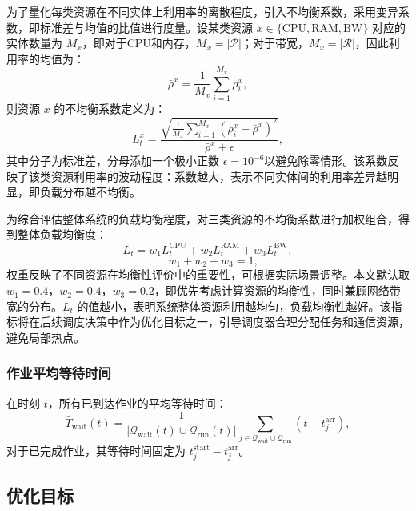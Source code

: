 为了量化每类资源在不同实体上利用率的离散程度，引入不均衡系数，采用变异系数，即标准差与均值的比值进行度量。设某类资源 $x \in \{\text{CPU}, \text{RAM}, \text{BW}\}$ 对应的实体数量为 $M_x$，即对于CPU和内存，$M_x = |\mathcal{P}|$；对于带宽，$M_x = |\mathcal{R}|$，因此利用率的均值为：
\begin{equation}
\bar{\rho}^x = \frac{1}{M_x} \sum_{i=1}^{M_x} \rho_i^x,
\end{equation}
则资源 $x$ 的不均衡系数定义为：
\begin{equation}
L_t^{x} = \frac{\sqrt{\frac{1}{M_x} \sum_{i=1}^{M_x} (\rho_i^x - \bar{\rho}^x)^2}}{\bar{\rho}^x + \epsilon},
\end{equation}
其中分子为标准差，分母添加一个极小正数 $\epsilon = 10^{-6}$以避免除零情形。该系数反映了该类资源利用率的波动程度：系数越大，表示不同实体间的利用率差异越明显，即负载分布越不均衡。

为综合评估整体系统的负载均衡程度，对三类资源的不均衡系数进行加权组合，得到整体负载均衡度：
\begin{equation}
L_t = w_1 L_t^{\text{CPU}} + w_2 L_t^{\text{RAM}} + w_3 L_t^{\text{BW}},
\end{equation}
\begin{equation}
\quad w_1 + w_2 + w_3 = 1,
\end{equation}
权重反映了不同资源在均衡性评价中的重要性，可根据实际场景调整。本文默认取 $w_1 = 0.4$，$w_2 = 0.4$，$w_3 = 0.2$，即优先考虑计算资源的均衡性，同时兼顾网络带宽的分布。$L_t$ 的值越小，表明系统整体资源利用越均匀，负载均衡性越好。该指标将在后续调度决策中作为优化目标之一，引导调度器合理分配任务和通信资源，避免局部热点。

\subsubsection{作业平均等待时间}

在时刻 $t$，所有已到达作业的平均等待时间：
\begin{equation}
    \bar{T}_{\text{wait}}(t) = \frac{1}{|\mathcal{Q}_{\text{wait}}(t) \cup \mathcal{Q}_{\text{run}}(t)|} \sum_{j \in \mathcal{Q}_{\text{wait}} \cup \mathcal{Q}_{\text{run}}} (t - t_j^{\text{arr}}),
\end{equation}
对于已完成作业，其等待时间固定为 $t_j^{\text{start}}-t_j^{\text{arr}}$。

\subsection{优化目标}

